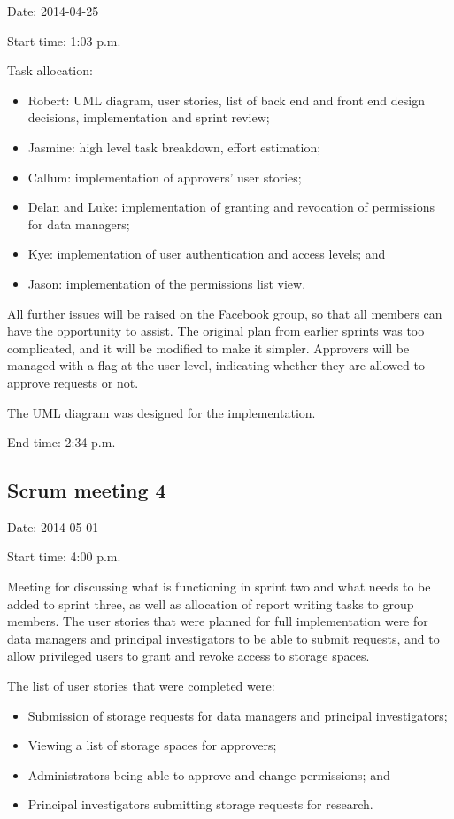 \documentclass[a4paper,titlepage,12pt]{article}
\begin{document}
Date: 2014-04-25

Start time: 1:03 p.m.

Task allocation:

\begin{itemize}
	\item Robert: UML diagram, user stories, list of back end and front end
	      design decisions, implementation and sprint review;
	\item Jasmine: high level task breakdown, effort estimation;
	\item Callum: implementation of approvers' user stories;
	\item Delan and Luke: implementation of granting and revocation of
	      permissions for data managers;
	\item Kye: implementation of user authentication and access levels; and
	\item Jason: implementation of the permissions list view.
\end{itemize}

All further issues will be raised on the Facebook group, so that all members
can have the opportunity to assist. The original plan from earlier sprints was
too complicated, and it will be modified to make it simpler. Approvers will be
managed with a flag at the user level, indicating whether they are allowed to
approve requests or not.

The UML diagram was designed for the implementation.

End time: 2:34 p.m.

\newpage

\subsection{Scrum meeting 4}

Date: 2014-05-01

Start time: 4:00 p.m.

Meeting for discussing what is functioning in sprint two and what needs to be
added to sprint three, as well as allocation of report writing tasks to group
members. The user stories that were planned for full implementation were for
data managers and principal investigators to be able to submit requests, and to
allow privileged users to grant and revoke access to storage spaces.

The list of user stories that were completed were:

\begin{itemize}
	\item Submission of storage requests for data managers and principal
	      investigators;
	\item Viewing a list of storage spaces for approvers;
	\item Administrators being able to approve and change permissions; and
	\item Principal investigators submitting storage requests for research.
\end{itemize}
\end{document}
